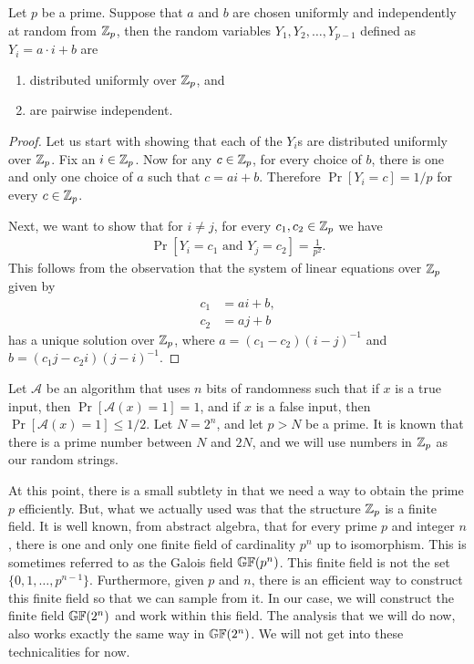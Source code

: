 \begin{lemma}
	Let $p$ be a prime. Suppose that $a$ and $b$ are chosen uniformly and independently at random from $\mathbb{Z}_p$, then the random variables $Y_1, Y_2, \ldots, Y_{p-1}$ defined as $Y_i = a\cdot i +b$ are
	\begin{enumerate}
		\item distributed uniformly over $\mathbb{Z}_p$, and 
		\item are pairwise independent.
	\end{enumerate}
	\label{lem:pi-zp}
\end{lemma}
\begin{proof}
	Let us start with showing that each of the $Y_i$s are distributed uniformly over $\mathbb{Z}_p$. Fix an $i \in \mathbb{Z}_p$. Now for any $c \in \mathbb{Z}_p$, for every choice of $b$, there is one and only one choice of $a$ such that $c = ai+b$. Therefore $\Pr[Y_i =c] = 1/p$ for every $c\in \mathbb{Z}_p$.
	
	Next, we want to show that for $i\neq j$, for every $c_1, c_2 \in \mathbb{Z}_p$ we have
	\begin{align*}
		\Pr[Y_i = c_1 \text{ and } Y_j=c_2] = \frac{1}{p^2}.
	\end{align*}
	This  follows from the observation that the system of linear equations over $\mathbb{Z}_p$ given by
	\begin{align*}
		c_1 &= ai + b,\\
		c_2 &= aj + b
	\end{align*}
	has a unique solution over $\mathbb{Z}_p$, where $a = (c_1-c_2)(i-j)^{-1}$ and $b = (c_1j -c_2i)(j-i)^{-1}$.
\end{proof}

Let $\mathcal{A}$ be an algorithm that uses $n$ bits of randomness such that if $x$ is a true input, then $\Pr[\mathcal{A}(x)=1]=1$, and if $x$ is a false input, then $\Pr[\mathcal{A}(x)=1] \leq 1/2$. Let $N = 2^n$, and let $p > N$ be a prime. It is known that there is a prime number between $N$ and $2N$, and we will use numbers in $\mathbb{Z}_p$ as our random strings. 

\begin{remark}
	At this point, there is a small subtlety in that we need a way to obtain the prime $p$ efficiently. But, what we actually used was that the structure $\mathbb{Z}_p$ is a finite field. It is well known, from abstract algebra, that for every prime $p$ and integer $n$, there is one and only one finite field of cardinality $p^n$ up to isomorphism. This is sometimes referred to as the Galois field $\mathbb{GF}(p^n)$. This finite field is not the set $\{0,1,\ldots, p^{n-1}\}$. Furthermore, given $p$ and $n$, there is an efficient way to construct this finite field so that we can sample from it. In our case, we will construct the finite field $\mathbb{GF}(2^n)$ and work within this field. The analysis that we will do now, also works exactly the same way in $\mathbb{GF}(2^n)$. We will not get into these technicalities for now.
\end{remark}

